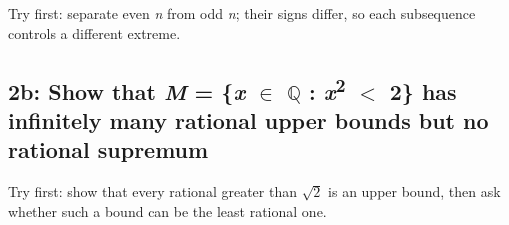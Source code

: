 \documentclass[11pt]{article}
\begin{document}
\begin{keepsection}
\begin{keepsection}
Try first: separate even \textit{n} from odd \textit{n}; their signs differ, so each subsequence controls a different extreme.

\end{keepsection}

\begin{keepsection}
\subsection{2b: Show that \textit{M} = \{\textit{x} \ensuremath{\in} \ensuremath{\mathbb{Q}} : \textit{x}\textsuperscript{2} \ensuremath{<} 2\} has infinitely many rational upper bounds but no rational supremum}

Try first: show that every rational greater than \ensuremath{\sqrt{2}} is an upper bound, then ask whether such a bound can be the least rational one.

\end{keepsection}
\end{keepsection}
\end{document}
